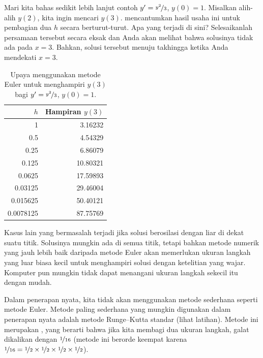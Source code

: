 Mari kita bahas sedikit lebih lanjut contoh
$y' = \nicefrac{y^2}{3}$, $y(0) = 1$.
Misalkan alih-alih $y(2)$, kita ingin mencari $y(3)$.
mencantumkan hasil usaha ini
untuk pembagian dua $h$ secara berturut-turut.  Apa yang
terjadi di sini?  Selesaikanlah persamaan tersebut secara eksak dan Anda akan
melihat bahwa solusinya tidak ada pada $x=3$.  Bahkan, solusi tersebut menuju
takhingga ketika Anda mendekati $x=3$.

\begin{table}[h!t]
\mybeginframe
\capstart
\begin{center}
\begin{tabular}{@{}rr@{}}
\toprule
$h$ & Hampiran $y(3)$ \\
\midrule
1        & 3.16232 \\
0.5      & 4.54329 \\
0.25     & 6.86079 \\
0.125    & 10.80321 \\
0.0625   & 17.59893 \\
0.03125  & 29.46004 \\
0.015625 & 50.40121 \\
0.0078125& 87.75769 \\
\bottomrule
\end{tabular}
\end{center}
\caption{Upaya menggunakan metode Euler untuk menghampiri $y(3)$ bagi
$y'=\nicefrac{y^2}{3}$, $y(0)=1$.\label{euler-table2:table}}
\myendframe
\end{table}

Kasus lain yang bermasalah terjadi jika solusi berosilasi dengan liar
di dekat suatu titik.
Solusinya
mungkin ada di semua titik, tetapi bahkan metode numerik yang jauh lebih baik daripada
metode Euler akan memerlukan ukuran langkah yang luar biasa kecil untuk menghampiri solusi
dengan ketelitian yang wajar.
Komputer pun mungkin tidak dapat menangani ukuran langkah sekecil itu dengan mudah.

\medskip

Dalam penerapan nyata, kita tidak akan menggunakan metode sederhana seperti metode Euler.
Metode paling sederhana yang mungkin digunakan dalam penerapan nyata adalah
metode Runge--Kutta standar (lihat latihan).  Metode ini merupakan
,
yang berarti bahwa jika kita membagi dua ukuran langkah,
galat dikalikan dengan $\nicefrac{1}{16}$
(metode ini berorde keempat karena $\nicefrac{1}{16} =
\nicefrac{1}{2} \times \nicefrac{1}{2}
\times \nicefrac{1}{2} \times \nicefrac{1}{2}$).

